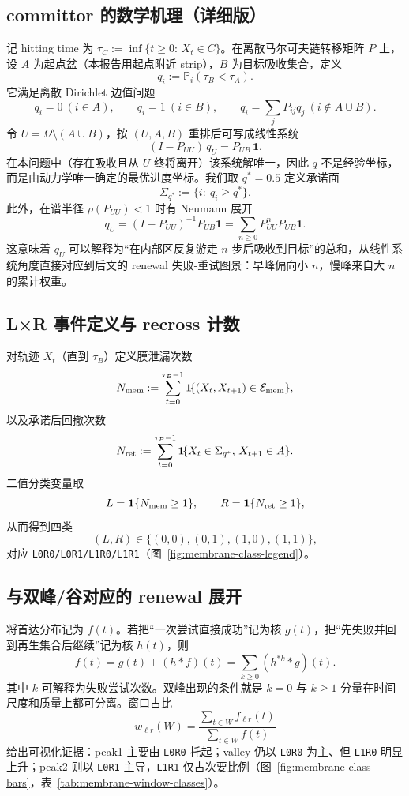 \documentclass[11pt,fontset=fandol]{ctexart}
\begin{document}
\subsection*{committor 的数学机理（详细版）}
记 hitting time 为 $\tau_C:=\inf\{t\ge 0:\,X_t\in C\}$。在离散马尔可夫链转移矩阵 $P$ 上，设 $A$ 为起点盆（本报告用起点附近 strip），$B$ 为目标吸收集合，定义
\[
q_i := \mathbb P_i(\tau_B < \tau_A).
\]
它满足离散 Dirichlet 边值问题
\[
q_i=0\ (i\in A),\qquad q_i=1\ (i\in B),\qquad
q_i=\sum_j P_{ij} q_j\ (i\notin A\cup B).
\]
令 $U=\Omega\setminus(A\cup B)$，按 $(U,A,B)$ 重排后可写成线性系统
\[
(I-P_{UU})\,q_U=P_{UB}\,\mathbf 1.
\]
在本问题中（存在吸收且从 $U$ 终将离开）该系统解唯一，因此 $q$ 不是经验坐标，而是由动力学唯一确定的最优进度坐标。我们取 $q^*=0.5$ 定义承诺面
\[
\Sigma_{q^*}:=\{i:\ q_i\ge q^*\}.
\]
此外，在谱半径 $\rho(P_{UU})<1$ 时有 Neumann 展开
\[
q_U=(I-P_{UU})^{-1}P_{UB}\mathbf 1
=\sum_{n\ge 0}P_{UU}^n P_{UB}\mathbf 1.
\]
这意味着 $q_U$ 可以解释为“在内部区反复游走 $n$ 步后吸收到目标”的总和，从线性系统角度直接对应到后文的 renewal 失败-重试图景：早峰偏向小 $n$，慢峰来自大 $n$ 的累计权重。

\subsection*{L×R 事件定义与 recross 计数}
对轨迹 $X_t$（直到 $\tau_B$）定义膜泄漏次数
\[
N_{\rm mem}:=\sum_{t=0}^{\tau_B-1}\mathbf 1\!\{(X_t,X_{t+1})\in\mathcal E_{\rm mem}\},
\]
以及承诺后回撤次数
\[
N_{\rm ret}:=\sum_{t=0}^{\tau_B-1}\mathbf 1\!\{X_t\in\Sigma_{q^*},\,X_{t+1}\in A\}.
\]
二值分类变量取
\[
L=\mathbf 1\{N_{\rm mem}\ge 1\},\qquad R=\mathbf 1\{N_{\rm ret}\ge 1\},
\]
从而得到四类
\[
(\!L,R\!)\in\{(0,0),(0,1),(1,0),(1,1)\},
\]
对应 \texttt{L0R0/L0R1/L1R0/L1R1}（图~\ref{fig:membrane-class-legend}）。

\subsection*{与双峰/谷对应的 renewal 展开}
将首达分布记为 $f(t)$。若把“一次尝试直接成功”记为核 $g(t)$，把“先失败并回到再生集合后继续”记为核 $h(t)$，则
\[
f(t)=g(t)+(h*f)(t)=\sum_{k\ge 0}(h^{*k}*g)(t).
\]
其中 $k$ 可解释为失败尝试次数。双峰出现的条件就是 $k=0$ 与 $k\ge1$ 分量在时间尺度和质量上都可分离。窗口占比
\[
w_{\ell r}(W)=\frac{\sum_{t\in W} f_{\ell r}(t)}{\sum_{t\in W} f(t)}
\]
给出可视化证据：peak1 主要由 \texttt{L0R0} 托起；valley 仍以 \texttt{L0R0} 为主、但 \texttt{L1R0} 明显上升；peak2 则以 \texttt{L0R1} 主导，\texttt{L1R1} 仅占次要比例（图~\ref{fig:membrane-class-bars}，表~\ref{tab:membrane-window-classes}）。
\end{document}
